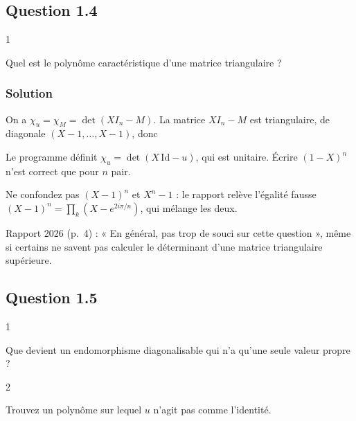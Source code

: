 \documentclass[11pt,a4paper]{article}
\newcommand{\equationajustee}[1]{%
  \sbox{\boiteequation}{$\displaystyle #1$}%
  \ifdim\wd\boiteequation>\linewidth
    \[\resizebox{\linewidth}{!}{\usebox{\boiteequation}}\]%
  \else
    \[#1\]%
  \fi}
\begin{document}
\hypertarget{question-1.4}{%
\subsection{Question 1.4}\label{question-1.4}}

\begin{indication}{1}

Quel est le polynôme caractéristique d'une matrice triangulaire ?

\end{indication}

\hypertarget{solution-3}{%
\subsubsection{Solution}\label{solution-3}}

On a \(\chi_u=\chi_M=\det(XI_n-M)\). La matrice \(XI_n-M\) est triangulaire, de diagonale \((X-1,\dots,X-1)\), donc
\equationajustee{\chi_u=(X-1)^n.}

\begin{piege}

Le programme définit \(\chi_u=\det(X\,\mathrm{Id}-u)\), qui est unitaire. Écrire \((1-X)^n\) n'est correct que pour \(n\) pair.

Ne confondez pas \((X-1)^n\) et \(X^n-1\) : le rapport relève l'égalité fausse \((X-1)^n=\prod_{k}(X-e^{2i\pi/n})\), qui mélange les deux.

\end{piege}

\begin{jury}

Rapport 2026 (p.~4) : « En général, pas trop de souci sur cette question », même si certains ne savent pas calculer le déterminant d'une matrice triangulaire supérieure.

\end{jury}

\hypertarget{question-1.5}{%
\subsection{Question 1.5}\label{question-1.5}}

\begin{indication}{1}

Que devient un endomorphisme diagonalisable qui n'a qu'une seule valeur propre ?

\end{indication}

\begin{indication}{2}

Trouvez un polynôme sur lequel \(u\) n'agit pas comme l'identité.

\end{indication}
\end{document}
